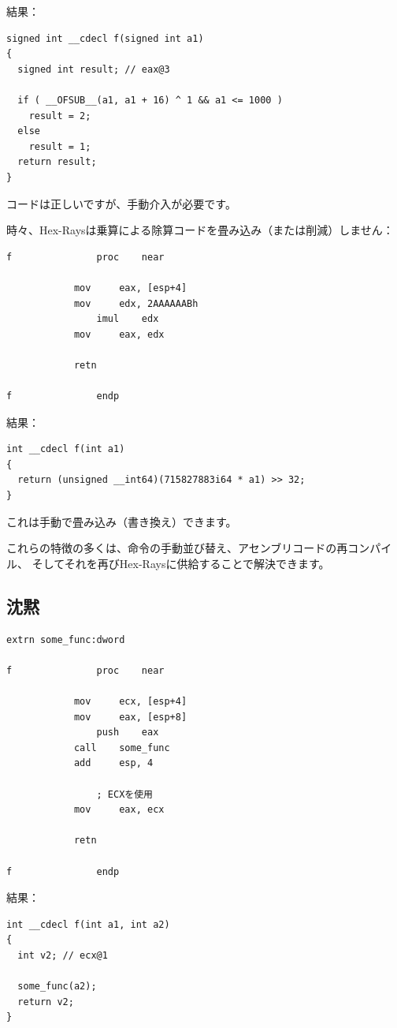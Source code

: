 結果：

\begin{lstlisting}
signed int __cdecl f(signed int a1)
{
  signed int result; // eax@3

  if ( __OFSUB__(a1, a1 + 16) ^ 1 && a1 <= 1000 )
    result = 2;
  else
    result = 1;
  return result;
}
\end{lstlisting}

コードは正しいですが、手動介入が必要です。

時々、Hex-Raysは乗算による除算コードを畳み込み（または削減）しません：

\begin{lstlisting}
f               proc    near

        	mov     eax, [esp+4]
	        mov     edx, 2AAAAAABh
                imul    edx
        	mov     eax, edx

	        retn

f               endp
\end{lstlisting}

結果：

\begin{lstlisting}
int __cdecl f(int a1)
{
  return (unsigned __int64)(715827883i64 * a1) >> 32;
}
\end{lstlisting}

これは手動で畳み込み（書き換え）できます。

これらの特徴の多くは、命令の手動並び替え、アセンブリコードの再コンパイル、
そしてそれを再びHex-Raysに供給することで解決できます。

\subsection{沈黙}

\begin{lstlisting}
extrn some_func:dword

f               proc    near

        	mov     ecx, [esp+4]
	        mov     eax, [esp+8]
                push    eax
        	call    some_func
	        add     esp, 4

                ; ECXを使用
        	mov     eax, ecx

	        retn

f               endp
\end{lstlisting}

結果：

\begin{lstlisting}
int __cdecl f(int a1, int a2)
{
  int v2; // ecx@1

  some_func(a2);
  return v2;
}
\end{lstlisting}

